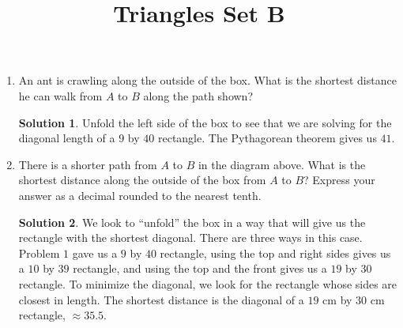 \documentclass{article}
\title{Triangles Set B}
\date{}
\author{}
\theoremstyle{definition}
\newtheorem*{solution}{Solution}
\begin{document}
\maketitle

\begin{multicols}{2}
    \begin{enumerate}
        \item An ant is crawling along the outside of the box.
            What is the shortest distance he can walk from $A$ to $B$ along the path shown?
            \begin{center}
            \end{center}
            \begin{solution}
                Unfold the left side of the box to see that we are solving for the diagonal length of a $9$ by $40$ rectangle.
                The Pythagorean theorem gives us $41$.
            \end{solution}
        \item There is a shorter path from $A$ to $B$ in the diagram above.
            What is the shortest distance along the outside of the box from $A$ to $B$?
            Express your answer as a decimal rounded to the nearest tenth.
            \begin{solution}
                We look to ``unfold'' the box in a way that will give us the rectangle with the shortest diagonal.
                There are three ways in this case.
                Problem $1$ gave us a $9$ by $40$ rectangle, using the top and right sides gives us a $10$ by $39$ rectangle, and using the top and the front gives us a $19$ by $30$ rectangle.
                To minimize the diagonal, we look for the rectangle whose sides are closest in length.
                The shortest distance is the diagonal of a $19$ cm by $30$ cm rectangle, $\approx 35.5$.
            \end{solution}

\end{enumerate}
\end{multicols}
\end{document}
